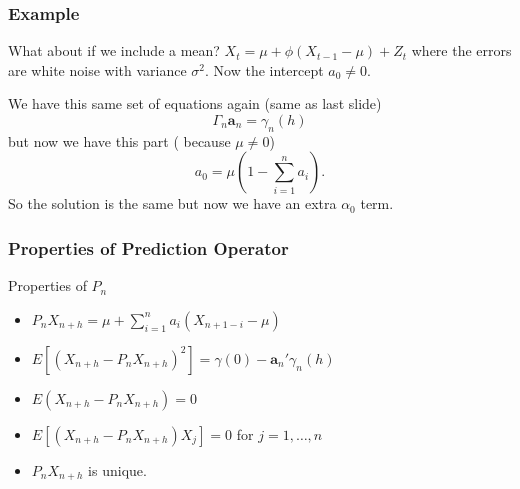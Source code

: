 \documentclass{beamer}
\begin{document}
\begin{frame}
\frametitle{Example}

What about if we include a mean? $X_t = \mu + \phi (X_{t-1} - \mu) + Z_t$ where the errors are white noise with variance $\sigma^2$. Now the intercept $a_0 \neq 0$.
\newline

We have this same set of equations again (same as last slide)
\[
\Gamma_n \mathbf{a}_n = \gamma_n(h) 
\]
but now we have this part ( because $\mu \neq 0$)
\[
a_0 = \mu\left(1 - \sum_{i=1}^n a_i\right) .
\]
So the solution is the same but now we have an extra $\alpha_0$ term.
\newline

\end{frame}



\begin{frame}
\frametitle{Properties of Prediction Operator}

\begin{block}{Properties of $P_n$}
\begin{itemize}
\item $P_nX_{n+h} = \mu + \sum_{i=1}^na_i(X_{n+1-i} - \mu)$
\item $E[(X_{n+h}-P_nX_{n+h})^2] = \gamma(0) -  \mathbf{a}_n'\gamma_n(h)$
\item $E(X_{n+h}-P_nX_{n+h}) = 0$
\item $E[(X_{n+h}-P_nX_{n+h})X_j] = 0$ for $j=1,\ldots,n$
\item $P_nX_{n+h}$ is unique.
\end{itemize}
\end{block}


\end{frame}
\end{document}
